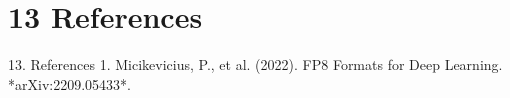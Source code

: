 \section{13 References}

 13. References
1. Micikevicius, P., et al. (2022). FP8 Formats for Deep Learning. *arXiv:2209.05433*.

